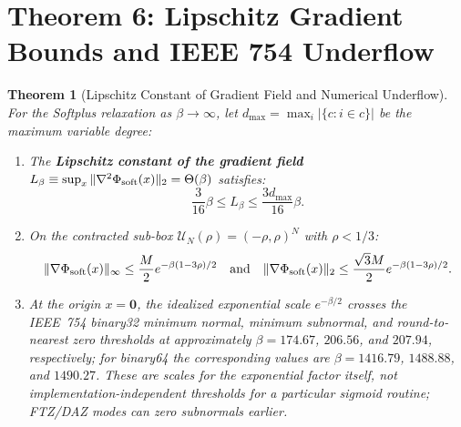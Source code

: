 \documentclass[11pt,a4paper]{article}
\newtheorem{theorem}{Theorem}[section]
\begin{document}
\section{Theorem 6: Lipschitz Gradient Bounds and IEEE 754 Underflow}

\begin{theorem}[Lipschitz Constant of Gradient Field and Numerical Underflow]
\label{thm:bifurcation}
For the Softplus relaxation as $\beta \to \infty$, let $d_{\max}=\max_i |\{c:i\in c\}|$ be the maximum variable degree:
\begin{enumerate}
    \item The \textbf{Lipschitz constant of the gradient field} $L_\beta \equiv \sup_x \|\nabla^2 \Phi_{\rm soft}(x)\|_2 = \Theta(\beta)$ satisfies:
    \begin{equation}
    \frac{3}{16} \beta \leq L_\beta \leq \frac{3 d_{\max}}{16} \beta.
    \end{equation}
    \item On the contracted sub-box $\mathcal{U}_N(\rho) = (-\rho, \rho)^N$ with $\rho < 1/3$:
    \begin{equation}
    \|\nabla \Phi_{\rm soft}(x)\|_\infty \leq \frac{M}{2} e^{-\beta(1 - 3\rho)/2} \quad\text{and}\quad \|\nabla \Phi_{\rm soft}(x)\|_2 \leq \frac{\sqrt{3} M}{2} e^{-\beta(1 - 3\rho)/2}.
    \end{equation}
    \item At the origin $x=\mathbf 0$, the idealized exponential scale $e^{-\beta/2}$ crosses the IEEE~754 binary32 minimum normal, minimum subnormal, and round-to-nearest zero thresholds at approximately
    $\beta=174.67$, $206.56$, and $207.94$, respectively; for binary64 the corresponding values are
    $\beta=1416.79$, $1488.88$, and $1490.27$.  These are scales for the exponential factor itself, not implementation-independent thresholds for a particular sigmoid routine; FTZ/DAZ modes can zero subnormals earlier.
\end{enumerate}
\end{theorem}
\end{document}
